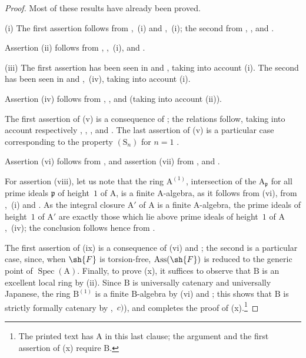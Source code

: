 \begin{proof}
Most of these results have already been proved.

(i) The first assertion follows from ,~(i) and ,~(i); the second from , ,  and .

Assertion (ii) follows from , ,~(i),  and .

(iii) The first assertion has been seen in  and , taking into account (i). The second has been seen in  and ,~(iv), taking into account (i).

Assertion (iv) follows from , ,  and  (taking into account (ii)).

The first assertion of (v) is a consequence of ; the relations follow, taking into account respectively , , ,  and . The last assertion of (v) is a particular case corresponding to the property $(\mathrm{S}_n)$ for $n=1$ .

Assertion (vi) follows from , and assertion (vii) from ,  and .

For assertion (viii), let us note that the ring $\mathrm{A}^{(1)}$, intersection of the $\mathrm{A}_\mathfrak{p}$ for all prime ideals $\mathfrak{p}$ of height~$1$ of $\mathrm{A}$, is a finite $\mathrm{A}$-algebra, as it follows from (vi), from ,~(i) and . As the integral closure $\mathrm{A}'$ of $\mathrm{A}$ is a finite $\mathrm{A}$-algebra, the prime ideals of height~$1$ of $\mathrm{A}'$ are exactly those which lie above prime ideals of height~$1$ of $\mathrm{A}$ ,~(iv); the conclusion follows hence from .

The first assertion of (ix) is a consequence of (vi) and ; the second is a particular case, since, when $\sh{F}$ is torsion-free, $\operatorname{Ass}(\sh{F})$ is reduced to the generic point of $\operatorname{Spec}(\mathrm{A})$. Finally, to prove (x), it suffices to observe that $\mathrm{B}$ is an excellent local ring by (ii). Since $\mathrm{B}$ is universally catenary and universally Japanese, the ring $\mathrm{B}^{(1)}$ is a finite $\mathrm{B}$-algebra by (vi) and ; this shows that $\mathrm{B}$ is strictly formally catenary by ,~$c)$), and completes the proof of (x).\footnote{The printed text has $\mathrm{A}$ in this last clause; the argument and the first assertion of (x) require $\mathrm{B}$.}
\end{proof}

